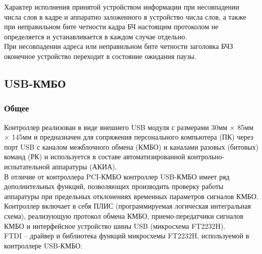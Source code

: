 		Характер исполнения принятой устройством информации при несовпадении числа слов в кадре и аппаратно заложенного в устройство числа слов, а также при неправильном бите четности кадра БЧ настоящим протоколом не определяется и устанавливается в каждом случае отдельно. \\
		
		При несовпадении адреса или неправильном бите четности заголовка БЧЗ оконечное устройство переходит в состояние ожидания паузы.
		
	\subsection{USB-КМБО}
	\subsubsection{Общее}
	Контроллер реализован в виде внешнего USB модуля с размерами 30мм $\times$ 85мм $\times$ 145мм и предназначен для сопряжения персонального компьютера (ПК) через порт USB с каналом межблочного обмена (КМБО) и каналами разовых (битовых) команд (РК) и используется в составе автоматизированной контрольно-испытательной аппаратуры (АКИА). \\
	
	В отличие от контроллера PCI-КМБО контроллер USB-КМБО имеет ряд дополнительных функций, позволяющих производить проверку работы аппаратуры при предельных отклонениях временных параметров сигналов КМБО. \\
	
	Контроллер включает в себя ПЛИС (программируемая логическая интегральная схема), реализующую протокол обмена КМБО, приемо-передатчики сигналов КМБО и интерфейсное устройство шины USB (микросхема FT2232H). \cite{FT2232H} \\
	
	FTDI – драйвер и библиотека функций микросхемы FT2232H, используемой в контроллере USB-КМБО. \cite{ftdi}
	
